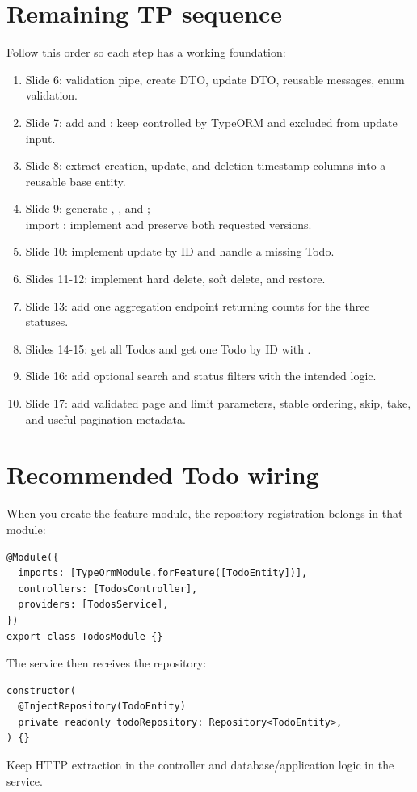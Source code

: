 \section{Remaining TP sequence}
Follow this order so each step has a working foundation:
\begin{enumerate}
\item Slide 6: validation pipe, create DTO, update DTO, reusable messages, enum validation.
\item Slide 7: add  and ; keep  controlled by TypeORM and excluded from update input.
\item Slide 8: extract creation, update, and deletion timestamp columns into a reusable base entity.
\item Slide 9: generate , , and ;\\ import ; implement  and preserve both requested versions.
\item Slide 10: implement update by ID and handle a missing Todo.
\item Slides 11-12: implement hard delete, soft delete, and restore.
\item Slide 13: add one aggregation endpoint returning counts for the three statuses.
\item Slides 14-15: get all Todos and get one Todo by ID with .
\item Slide 16: add optional search and status filters with the intended  logic.
\item Slide 17: add validated page and limit parameters, stable ordering, skip, take, and useful pagination metadata.
\end{enumerate}

\section{Recommended Todo wiring}
When you create the feature module, the repository registration belongs in that module:
\begin{lstlisting}
@Module({
  imports: [TypeOrmModule.forFeature([TodoEntity])],
  controllers: [TodosController],
  providers: [TodosService],
})
export class TodosModule {}
\end{lstlisting}
The service then receives the repository:
\begin{lstlisting}
constructor(
  @InjectRepository(TodoEntity)
  private readonly todoRepository: Repository<TodoEntity>,
) {}
\end{lstlisting}
Keep HTTP extraction in the controller and database/application logic in the service.

